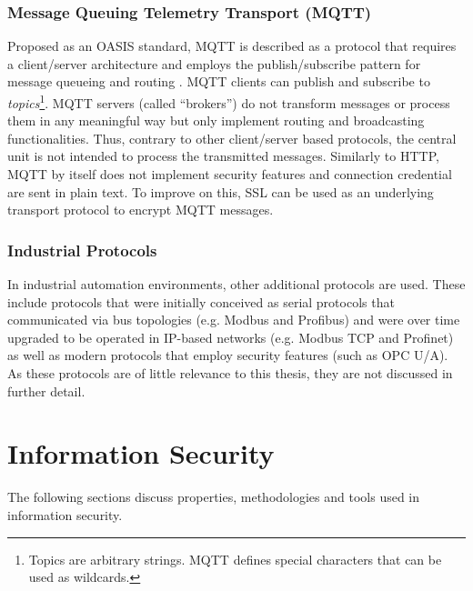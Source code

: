 \subsubsection{Message Queuing Telemetry Transport (\ac{MQTT})}
Proposed as an \ac{OASIS} standard, \ac{MQTT} is described as a protocol that requires a client/server architecture and employs the publish/subscribe pattern for message queueing and routing \cite{gupta_banks_2019}. \ac{MQTT} clients can publish and subscribe to \emph{topics}\footnote{Topics are arbitrary strings. \ac{MQTT} defines special characters that can be used as wildcards.}. \ac{MQTT} servers (called \enquote{brokers}) do not transform messages or process them in any meaningful way but only implement routing and broadcasting functionalities. Thus, contrary to other client/server based protocols, the central unit is not intended to process the transmitted messages. Similarly to \ac{HTTP}, \ac{MQTT} by itself does not implement security features and connection credential are sent in plain text. To improve on this, \ac{SSL} can be used as an underlying transport protocol to encrypt \ac{MQTT} messages.

\subsubsection{Industrial Protocols}
In industrial automation environments, other additional protocols are used. These include protocols that were initially conceived as serial protocols that communicated via bus topologies (e.g. Modbus and Profibus) and were over time upgraded to be operated in \ac{IP}-based networks (e.g. Modbus \ac{TCP} and Profinet) as well as modern protocols that employ security features (such as \ac{OPC U/A}). As these protocols are of little relevance to this thesis, they are not discussed in further detail.

\section{Information Security}
\label{sec:information-security}
The following sections discuss properties, methodologies and tools used in information security.

